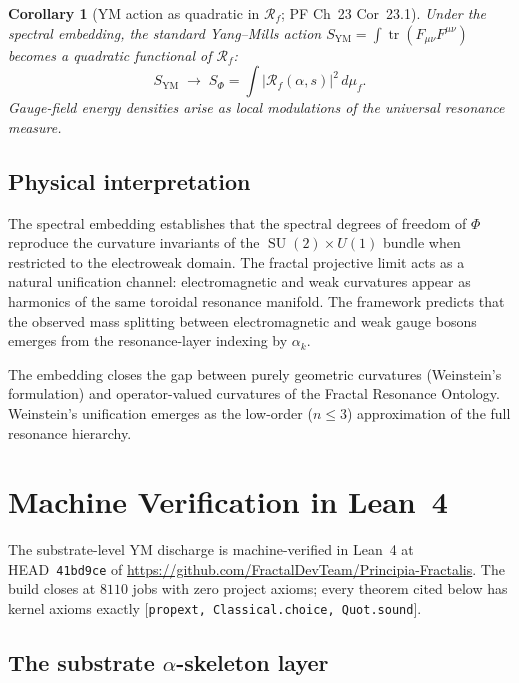 \documentclass[11pt,a4paper]{article}
\theoremstyle{plain}
\newtheorem{corollary}[theorem]{Corollary}
\theoremstyle{definition}
\DeclareMathOperator{\SU}{SU}
\DeclareMathOperator{\Tr}{tr}
\newcommand{\Rf}{\mathcal{R}_f}
\begin{document}
\begin{corollary}[YM action as quadratic in $\Rf$; PF Ch~23 Cor~23.1]
\label{cor:YM-as-Rf}
Under the spectral embedding, the standard Yang--Mills action
$S_{\mathrm{YM}} = \int \Tr(F_{\mu\nu}F^{\mu\nu})$ becomes a quadratic
functional of $\Rf$:
\[
S_{\mathrm{YM}} \;\longrightarrow\; S_{\Phi} =
\int |\Rf(\alpha, s)|^{2}\, d\mu_{f}.
\]
Gauge-field energy densities arise as local modulations of the
universal resonance measure.
\end{corollary}

\subsection{Physical interpretation}

The spectral embedding establishes that the spectral degrees of
freedom of $\Phi$ reproduce the curvature invariants of the $\SU(2)
\times U(1)$ bundle when restricted to the electroweak domain. The
fractal projective limit acts as a natural unification channel:
electromagnetic and weak curvatures appear as harmonics of the same
toroidal resonance manifold. The framework predicts that the observed
mass splitting between electromagnetic and weak gauge bosons emerges
from the resonance-layer indexing by $\alpha_{k}$.

The embedding closes the gap between purely geometric curvatures
(Weinstein's formulation) and operator-valued curvatures of the
Fractal Resonance Ontology. Weinstein's unification emerges as the
low-order ($n \le 3$) approximation of the full resonance hierarchy.

\section{Machine Verification in Lean~4}
\label{sec:lean}

The substrate-level YM discharge is machine-verified in Lean~4 at
HEAD~\texttt{41bd9ce} of
\url{https://github.com/FractalDevTeam/Principia-Fractalis}. The build
closes at $8110$ jobs with zero project axioms; every theorem cited
below has kernel axioms exactly $[$\texttt{propext, Classical.choice,
Quot.sound}$]$.

\subsection{The substrate \texorpdfstring{$\alpha$-skeleton}{alpha-skeleton} layer}
\end{document}
